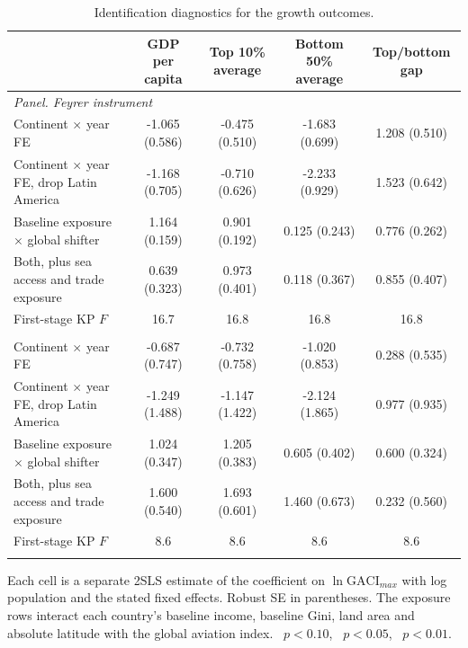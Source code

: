 \begin{table}[H]\centering\caption{Identification diagnostics for the growth outcomes.}\label{tab:a_growth_diag}
\begin{threeparttable}\small\begin{tabular}{lcccc}
\toprule
 & GDP per capita & Top 10\% average & Bottom 50\% average & Top/bottom gap \\
\midrule
\multicolumn{5}{l}{\emph{Panel. Feyrer instrument}}\\
Continent $\times$ year FE & -1.065\sym{*} (0.586) & -0.475 (0.510) & -1.683\sym{**} (0.699) & 1.208\sym{**} (0.510) \\
Continent $\times$ year FE, drop Latin America & -1.168\sym{*} (0.705) & -0.710 (0.626) & -2.233\sym{**} (0.929) & 1.523\sym{**} (0.642) \\
Baseline exposure $\times$ global shifter & 1.164\sym{***} (0.159) & 0.901\sym{***} (0.192) & 0.125 (0.243) & 0.776\sym{***} (0.262) \\
Both, plus sea access and trade exposure & 0.639\sym{**} (0.323) & 0.973\sym{**} (0.401) & 0.118 (0.367) & 0.855\sym{**} (0.407) \\
First-stage KP $F$ & 16.7 & 16.8 & 16.8 & 16.8 \\
\addlinespace
\multicolumn{5}{l}{\emph{Panel. Tourism-heritage instrument}}\\
Continent $\times$ year FE & -0.687 (0.747) & -0.732 (0.758) & -1.020 (0.853) & 0.288 (0.535) \\
Continent $\times$ year FE, drop Latin America & -1.249 (1.488) & -1.147 (1.422) & -2.124 (1.865) & 0.977 (0.935) \\
Baseline exposure $\times$ global shifter & 1.024\sym{***} (0.347) & 1.205\sym{***} (0.383) & 0.605 (0.402) & 0.600\sym{*} (0.324) \\
Both, plus sea access and trade exposure & 1.600\sym{***} (0.540) & 1.693\sym{***} (0.601) & 1.460\sym{**} (0.673) & 0.232 (0.560) \\
First-stage KP $F$ & 8.6 & 8.6 & 8.6 & 8.6 \\
\addlinespace
\bottomrule
\end{tabular}
\begin{tablenotes}\footnotesize\item Each cell is a separate 2SLS estimate of the coefficient on $\ln\mathrm{GACI}_{max}$ with log population and the stated fixed effects. Robust SE in parentheses. The exposure rows interact each country's baseline income, baseline Gini, land area and absolute latitude with the global aviation index. \sym{*}~$p<0.10$, \sym{**}~$p<0.05$, \sym{***}~$p<0.01$.\end{tablenotes}\end{threeparttable}\end{table}

